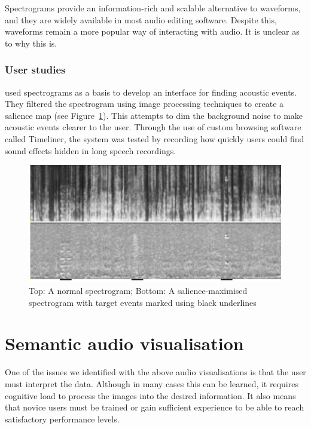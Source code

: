 Spectrograms provide an information-rich and scalable alternative to waveforms, and they are widely available in most
audio editing software. Despite this, waveforms remain a more popular way of interacting with audio. It is unclear as
to why this is.

\subsubsection{User studies}

\citet{Goudeseune2012} used spectrograms as a basis to develop an interface for finding acoustic events.  They filtered
the spectrogram using image processing techniques to create a salience map (see Figure~\ref{fig:timeliner}). This
attempts to dim the background noise to make acoustic events clearer to the user.  Through the use of custom browsing
software called Timeliner, the system was tested by recording how quickly users could find sound effects hidden in long
speech recordings.

\begin{figure}[ht]
  \centering
  \includegraphics[width=0.95\linewidth]{figs/spectrogram-salience.png}
  \caption{Top: A normal spectrogram; Bottom: A salience-maximised spectrogram with target events marked using black
    underlines}
  \label{fig:timeliner}
\end{figure}

\section{Semantic audio visualisation}\label{sec:semantic}

One of the issues we identified with the above audio visualisations is that the user must interpret the data. Although
in many cases this can be learned, it requires cognitive load to process the images into the desired information. It
also means that novice users must be trained or gain sufficient experience to be able to reach satisfactory performance
levels.

